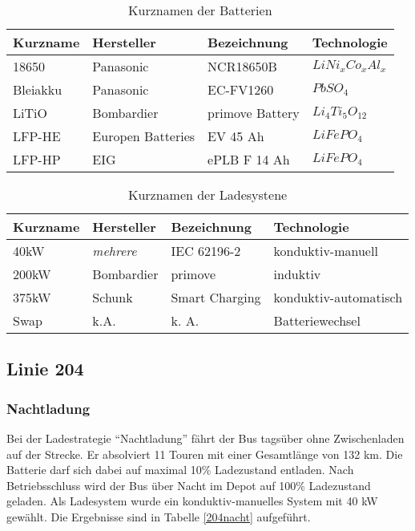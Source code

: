 \begin{table}\centering
	\begin{tabularx}{\textwidth}{XXXl}
		\toprule
		Kurzname & Hersteller        & Bezeichnung     & Technologie      \\ \midrule
		18650    & Panasonic         & NCR18650B       & $LiNi_xCo_xAl_x$ \\
		Bleiakku & Panasonic         & EC-FV1260       & $PbSO_4$         \\
		LiTiO    & Bombardier        & primove Battery & $Li_4Ti_5O_{12}$ \\
		LFP-HE   & Europen Batteries & EV 45 Ah        & $LiFePO_4$       \\
		LFP-HP   & EIG               & ePLB F 14 Ah    & $LiFePO_4$       \\ \bottomrule
	\end{tabularx}
	\caption{Kurznamen der Batterien}
	\label{batNamen}
\end{table}

\begin{table}\centering
	\begin{tabularx}{\textwidth}{XXXl}
		\toprule
		Kurzname & Hersteller        & Bezeichnung     & Technologie      \\ \midrule
		40kW    & \emph{mehrere}         & IEC 62196-2       & konduktiv-manuell \\
		200kW & Bombardier         & primove       & induktiv         \\
		375kW    & Schunk        & Smart Charging & konduktiv-automatisch \\
		Swap   & k.A.  & k. A.       & Batteriewechsel    \\ \bottomrule
	\end{tabularx}
	\caption{Kurznamen der Ladesystene}
	\label{ladeNamen}
\end{table}

\subsection{Linie 204}
\subsubsection{Nachtladung}
\label{erkl204nacht}
Bei der Ladestrategie "`Nachtladung"' fährt der Bus tagsüber ohne Zwischenladen auf der Strecke. Er absolviert 11 Touren mit einer Gesamtlänge von 132 km. Die Batterie darf sich dabei auf maximal 10\% Ladezustand entladen. Nach Betriebsschluss wird der Bus über Nacht im Depot auf 100\% Ladezustand geladen. Als Ladesystem wurde ein konduktiv-manuelles System mit 40 kW gewählt. Die Ergebnisse sind in Tabelle \ref{204nacht} aufgeführt.


